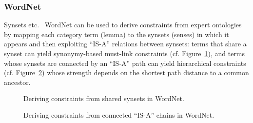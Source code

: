 \subsubsection{WordNet}
Synsets etc.~\cite{fellbaum2010wordnet}
WordNet can be used to derive constraints from expert ontologies by mapping each category term (lemma) to the synsets (senses) in which it appears and then exploiting ``IS-A'' relations between synsets: terms that share a synset can yield synonymy-based must-link constraints (cf. Figure~\ref{fig:wordnet-must-link-constraints}), and terms whose synsets are connected by an ``IS-A'' path can yield hierarchical constraints (cf. Figure~\ref{fig:wordnet-mlb-constraints}) whose strength depends on the shortest path distance to a common ancestor.
\begin{figure}[t]
    \centering
    \caption{Deriving constraints from shared synsets in WordNet.}
    \label{fig:wordnet-must-link-constraints}
\end{figure}
\begin{figure}[t]
    \centering
    \caption{Deriving constraints from connected ``IS-A'' chains in WordNet.}
    \label{fig:wordnet-mlb-constraints}
\end{figure}
